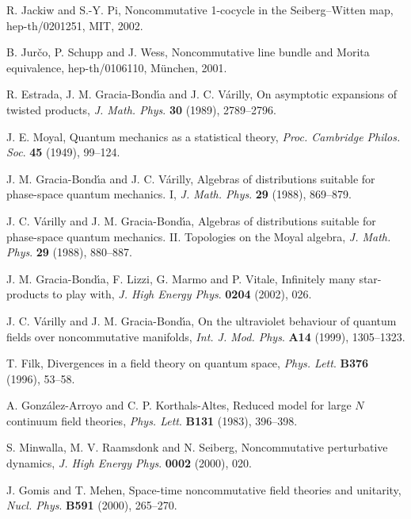 \documentclass[a4paper,12pt]{article}
\newcommand{\1}{\mathbf{1}}         %
\newcommand{\7}{\dagger}            %
\newcommand{\8}{\bullet}            %
\renewcommand{\.}{\cdot}            %
\renewcommand{\:}{\colon}           %
\begin{document}
\begin{thebibliography}{74}
R. Jackiw and S.-Y. Pi,
Noncommutative 1-cocycle in the Seiberg--Witten map,
hep-th/0201251, MIT, 2002.

B. Jur\v{c}o, P. Schupp and J. Wess,
Noncommutative line bundle and Morita equivalence,
hep-th/0106110, M\"unchen, 2001.

R. Estrada, J. M. Gracia-Bond\'{\i}a and J. C. V\'arilly,
On asymptotic expansions of twisted products,
\textit{J. Math. Phys}. {\bf 30} (1989), 2789--2796.

J. E. Moyal,
Quantum mechanics as a statistical theory,
\textit{Proc. Cambridge Philos. Soc}. {\bf 45} (1949), 99--124.

J. M. Gracia-Bond{\'\i}a and J. C. V\'arilly,
Algebras of distributions suitable for phase-space quantum
mechanics. I,
\textit{J. Math. Phys}. {\bf 29} (1988), 869--879.

J. C. V\'arilly and J. M. Gracia-Bond{\'\i}a,
Algebras of distributions suitable for phase-space quantum
mechanics. II. Topologies on the Moyal algebra,
\textit{J. Math. Phys}. {\bf 29} (1988), 880--887.

J. M. Gracia-Bond\'{\i}a, F. Lizzi, G. Marmo and P. Vitale,
Infinitely many star-products to play with,
\textit{J. High Energy Phys}. {\bf 0204} (2002), 026.

J. C. V\'arilly and J. M. Gracia-Bond\'{\i}a,
On the ultraviolet behaviour of quantum fields over noncommutative
manifolds,
\textit{Int. J. Mod. Phys}. {\bf A14} (1999), 1305--1323.

T. Filk,
Divergences in a field theory on quantum space,
\textit{Phys. Lett}. {\bf B376} (1996), 53--58.

A. Gonz\'alez-Arroyo and C. P. Korthals-Altes,
Reduced model for large $N$ continuum field theories,
\textit{Phys. Lett}. {\bf B131} (1983), 396--398.

S. Minwalla, M. V. Raamsdonk and N. Seiberg,
Noncommutative perturbative dynamics,
\textit{J. High Energy Phys}. {\bf 0002} (2000), 020.

J. Gomis and T. Mehen,
Space-time noncommutative field theories and unitarity,
\textit{Nucl. Phys}. {\bf B591} (2000), 265--270.


\end{thebibliography}
\end{document}
